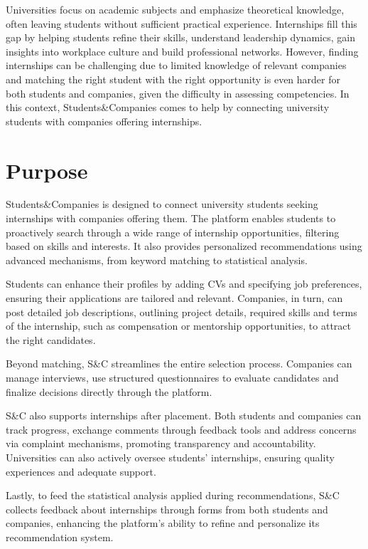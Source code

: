 Universities focus on academic subjects and emphasize theoretical knowledge, often leaving students without sufficient practical experience.
Internships fill this gap by helping students refine their skills, understand leadership dynamics, gain insights into workplace culture and build professional networks.
However, finding internships can be challenging due to limited knowledge of relevant companies and matching the right student with the right opportunity is even harder for both students and companies, given the difficulty in assessing competencies.
In this context, Students\&Companies comes to help by connecting university students with companies offering internships.

\section{Purpose}
Students\&Companies is designed to connect university students seeking internships with companies offering them.
The platform enables students to proactively search through a wide range of internship opportunities, filtering based on skills and interests.
It also provides personalized recommendations using advanced mechanisms, from keyword matching to statistical analysis.

Students can enhance their profiles by adding CVs and specifying job preferences, ensuring their applications are tailored and relevant.
Companies, in turn, can post detailed job descriptions, outlining project details, required skills and terms of the internship, such as compensation or mentorship opportunities, to attract the right candidates.

Beyond matching, S\&C streamlines the entire selection process.
Companies can manage interviews, use structured questionnaires to evaluate candidates and finalize decisions directly through the platform. 

S\&C also supports internships after placement.
Both students and companies can track progress, exchange comments through feedback tools and address concerns via complaint mechanisms, promoting transparency and accountability.
Universities can also actively oversee students' internships, ensuring quality experiences and adequate support.

Lastly, to feed the statistical analysis applied during recommendations, S\&C collects feedback about internships through forms from both students and companies, enhancing the platform's ability to refine and personalize its recommendation system.

